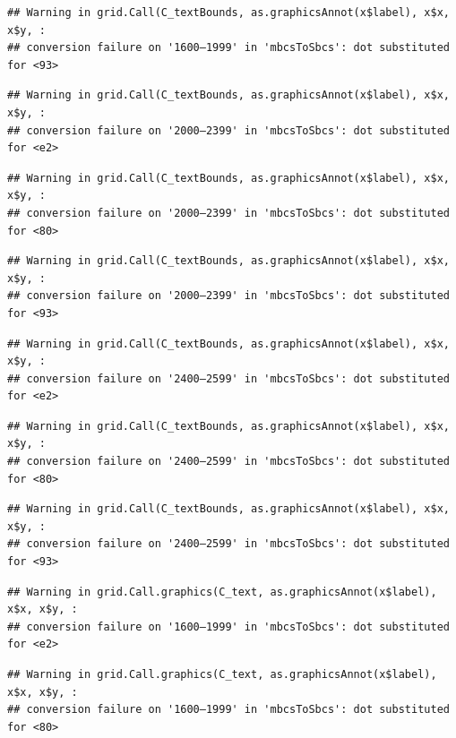 \documentclass[
]{article}
\begin{document}
\begin{verbatim}
## Warning in grid.Call(C_textBounds, as.graphicsAnnot(x$label), x$x, x$y, :
## conversion failure on '1600–1999' in 'mbcsToSbcs': dot substituted for <93>
\end{verbatim}

\begin{verbatim}
## Warning in grid.Call(C_textBounds, as.graphicsAnnot(x$label), x$x, x$y, :
## conversion failure on '2000–2399' in 'mbcsToSbcs': dot substituted for <e2>
\end{verbatim}

\begin{verbatim}
## Warning in grid.Call(C_textBounds, as.graphicsAnnot(x$label), x$x, x$y, :
## conversion failure on '2000–2399' in 'mbcsToSbcs': dot substituted for <80>
\end{verbatim}

\begin{verbatim}
## Warning in grid.Call(C_textBounds, as.graphicsAnnot(x$label), x$x, x$y, :
## conversion failure on '2000–2399' in 'mbcsToSbcs': dot substituted for <93>
\end{verbatim}

\begin{verbatim}
## Warning in grid.Call(C_textBounds, as.graphicsAnnot(x$label), x$x, x$y, :
## conversion failure on '2400–2599' in 'mbcsToSbcs': dot substituted for <e2>
\end{verbatim}

\begin{verbatim}
## Warning in grid.Call(C_textBounds, as.graphicsAnnot(x$label), x$x, x$y, :
## conversion failure on '2400–2599' in 'mbcsToSbcs': dot substituted for <80>
\end{verbatim}

\begin{verbatim}
## Warning in grid.Call(C_textBounds, as.graphicsAnnot(x$label), x$x, x$y, :
## conversion failure on '2400–2599' in 'mbcsToSbcs': dot substituted for <93>
\end{verbatim}

\begin{verbatim}
## Warning in grid.Call.graphics(C_text, as.graphicsAnnot(x$label), x$x, x$y, :
## conversion failure on '1600–1999' in 'mbcsToSbcs': dot substituted for <e2>
\end{verbatim}

\begin{verbatim}
## Warning in grid.Call.graphics(C_text, as.graphicsAnnot(x$label), x$x, x$y, :
## conversion failure on '1600–1999' in 'mbcsToSbcs': dot substituted for <80>
\end{verbatim}
\end{document}
